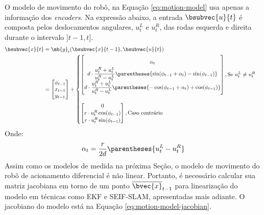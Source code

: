 O modelo de movimento do robô, na Equação \ref{eq:motion-model} usa apenas a informação dos \textit{encoders}. Na 
expressão abaixo, a entrada 
$\bsubvec{u}{t}$ é composta pelos deslocamentos angulares, $u_t^L$ e $u_t^R$, das rodas esquerda e direita durante o intervalo $]t-1, t]$.
\newcommand{\factor}{d\cdot\dfrac{u_t^{R} + u_t^L}{u_t^R - u_t^L}}
\begin{equation}
\begin{aligned}
  \bsubvec{x}{t} &= \mb{g}_\mathrm{r}(\bsubvec{x}{t-1}, \bsubvec{u}{t}) \\
  &= \begin{bmatrix}
      \phi_{t-1}  \\ x_{t-1} \\ y_{t-1}
    \end{bmatrix} + 
  \begin{cases}
  \renewcommand{\arraystretch}{1.8}
    \begin{bmatrix}
      \alpha_t
      \\
      \factor \parentheses{\sin(\phi_{t-1} + \alpha_t) - \sin(\phi_{t-1})} 
      \\
      \factor \parentheses{-\cos(\phi_{t-1} + \alpha_t) + \cos(\phi_{t-1})}
    \end{bmatrix}, \text{Se } u_t^L \neq u_t^R \\ 
    \\
    \renewcommand{\arraystretch}{1.1}
    \begin{bmatrix}
      0
      \\
      r\cdot u_t^R \cos(\phi_{t-1}) 
      \\
      r\cdot u_t^R \sin(\phi_{t-1}) 
    \end{bmatrix}, \text{Caso contrário}
  \end{cases}
\end{aligned}
\label{eq:motion-model}
\end{equation}
\renewcommand{\arraystretch}{1}
Onde:
\begin{equation}
  \alpha_t = \dfrac{r}{2d} \parentheses{u_t^L - u_t^R}
\end{equation}
Assim como os modelos de medida na próxima Seção, o modelo de movimento do 
robô de acionamento diferencial é não linear. Portanto, é necessário calcular 
sua matriz jacobiana em torno de um ponto $\overline{\bvec{x}}_{t-1}$ para linearização do modelo em técnicas como EKF e SEIF-SLAM, apresentadas 
mais adiante. O jacobiano do modelo \robotModel{} está na Equação 
\ref{eq:motion-model-jacobian}.
